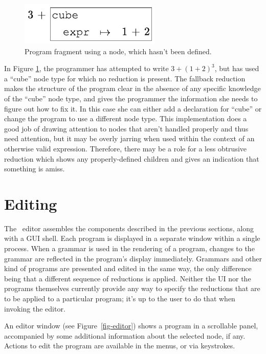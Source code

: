 \begin{figure}[t]
  \begin{center}
  \includegraphics{src/image/gen.pdf}
  \end{center}
  \caption{Program fragment using a  node, which hasn't been defined.}
  \label{fig-general}
\end{figure}

In Figure \ref{fig-general}, the programmer has attempted to write 
$3  + (1 + 2)^3$, 
but has used a ``cube'' node type for which no reduction is present. The fallback reduction makes the structure of the program clear in the absence of any specific knowledge of the ``cube'' node type, and gives the programmer the information she needs to figure out how to fix it. In this case she can either add a declaration for ``cube'' or change the program to use a different node type. This implementation does a good job of drawing attention to nodes that aren't handled properly and thus need attention, but it may be overly jarring when used within the context of an otherwise valid expression. Therefore, there may be a role for a less obtrusive reduction which shows any properly-defined children and gives an indication that something is amiss.


%
%
\section{Editing}
The \Meta\ editor assembles the components described in the previous sections, along with a GUI shell. Each program is displayed in a separate window within a single process. When a grammar is used in the rendering of a program, changes to the grammar are reflected in the program's display immediately. Grammars and other kind of programs are presented and edited in the same way, the only difference being that a different sequence of reductions is applied. Neither the UI nor the programs themselves currently provide any way to specify the reductions that are to be applied to a particular program; it's up to the user to do that when invoking the editor.

An editor window (see Figure\ \ref{fig-editor}) shows a program in a scrollable panel, accompanied by some additional information about the selected node, if any. Actions to edit the program are available in the menus, or via keystrokes.


